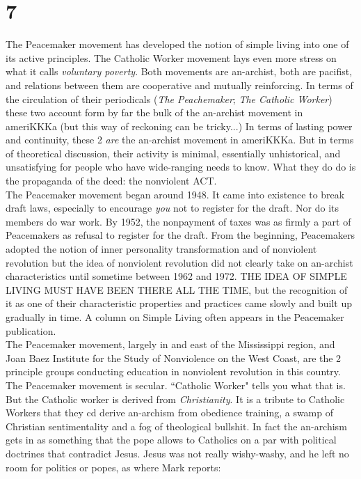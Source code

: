 \section*{7}
The Peacemaker movement has developed the notion of simple living into one of its active principles. The Catholic Worker movement lays even more stress on what it calls \emph{voluntary poverty}. Both movements are an-archist, both are pacifist, and relations between them are cooperative and mutually reinforcing. In terms of the circulation of their periodicals (\emph{The Peachemaker}; \emph{The Catholic Worker}) these two account form by far the bulk of the an-archist movement in ameriKKKa (but this way of reckoning can be tricky...) In terms of lasting power and continuity, these 2 \emph{are} the an-archist movement in ameriKKKa. But in terms of theoretical discussion, their activity is minimal, essentially unhistorical, and unsatisfying for people who have wide-ranging needs to know. What they do do is the propaganda of the deed: the nonviolent ACT.\\
The Peacemaker movement began around 1948. It came into existence to break draft laws, especially to encourage \emph{you} not to register for the draft. Nor do its members do war work. By 1952, the nonpayment of taxes was as firmly a part of Peacemakers as refusal to register for the draft. From the beginning, Peacemakers adopted the notion of inner personality transformation and of nonviolent revolution but the idea of nonviolent revolution did not clearly take on an-archist characteristics until sometime between 1962 and 1972. THE IDEA OF SIMPLE LIVING MUST HAVE BEEN THERE ALL THE TIME, but the recognition of it as one of their characteristic properties and practices came slowly and built up gradually in time. A column on Simple Living often appears in the Peacemaker publication.\\
The Peacemaker movement, largely in and east of the Mississippi region, and Joan Baez Institute for the Study of Nonviolence on the West Coast, are the 2 principle groups conducting education in nonviolent revolution in this country.\\
The Peacemaker movement is secular. ``Catholic Worker" tells you what that is. But the Catholic worker is derived from \emph{Christianity}. It is a tribute to Catholic Workers that they cd derive an-archism from obedience training, a swamp of Christian sentimentality and a fog of theological bullshit. In fact the an-archism gets in as something that the pope allows to Catholics on a par with political doctrines that contradict Jesus. Jesus was not really wishy-washy, and he left no room for politics or popes, as where Mark reports:
